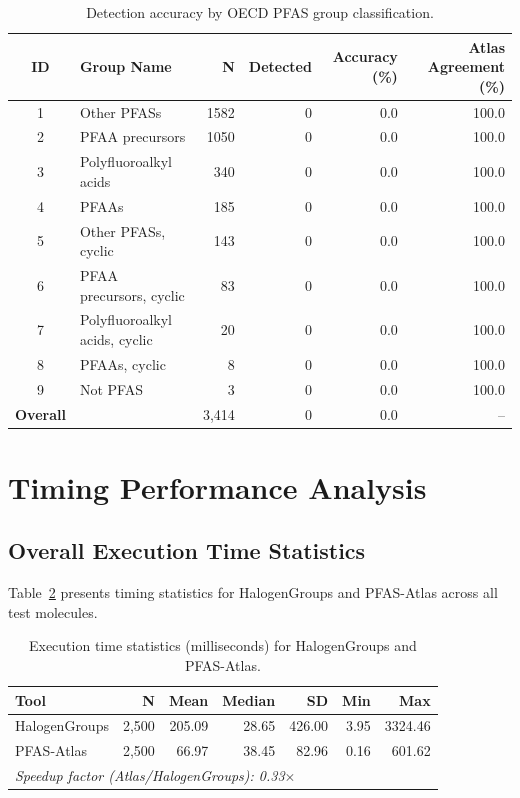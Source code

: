\begin{table}[htbp]
\centering
\caption{Detection accuracy by OECD PFAS group classification.}
\label{tab:oecd_accuracy}
\begin{tabular}{clrrrr}
\toprule
\rowcolor[HTML]{D6E4F5}\textbf{ID} & \textbf{Group Name} & \textbf{N} & \textbf{Detected} & \textbf{Accuracy (\%)} & \textbf{Atlas Agreement (\%)} \\
\midrule
\rowcolor[HTML]{FAEADE}1 & Other PFASs & 1582 & 0 & 0.0 & 100.0 \\
2 & PFAA precursors & 1050 & 0 & 0.0 & 100.0 \\
\rowcolor[HTML]{FAEADE}3 & Polyfluoroalkyl acids & 340 & 0 & 0.0 & 100.0 \\
4 & PFAAs & 185 & 0 & 0.0 & 100.0 \\
\rowcolor[HTML]{FAEADE}5 & Other PFASs, cyclic & 143 & 0 & 0.0 & 100.0 \\
6 & PFAA precursors, cyclic & 83 & 0 & 0.0 & 100.0 \\
\rowcolor[HTML]{FAEADE}7 & Polyfluoroalkyl acids, cyclic & 20 & 0 & 0.0 & 100.0 \\
8 & PFAAs, cyclic & 8 & 0 & 0.0 & 100.0 \\
\rowcolor[HTML]{FAEADE}9 & Not PFAS & 3 & 0 & 0.0 & 100.0 \\
\midrule
\textbf{Overall} & & 3,414 & 0 & 0.0 & -- \\
\bottomrule
\end{tabular}
\end{table}

\section*{Timing Performance Analysis}

\subsection*{Overall Execution Time Statistics}

Table~\ref{tab:timing_overall} presents timing statistics for HalogenGroups and PFAS-Atlas across all test molecules.

\begin{table}[htbp]
\centering
\caption{Execution time statistics (milliseconds) for HalogenGroups and PFAS-Atlas.}
\label{tab:timing_overall}
\begin{tabular}{lrrrrrr}
\toprule
\rowcolor[HTML]{D6E4F5}\textbf{Tool} & \textbf{N} & \textbf{Mean} & \textbf{Median} & \textbf{SD} & \textbf{Min} & \textbf{Max} \\
\midrule
\rowcolor[HTML]{FAEADE}HalogenGroups & 2,500 & 205.09 & 28.65 & 426.00 & 3.95 & 3324.46 \\
\rowcolor[HTML]{D6E4F5}PFAS-Atlas & 2,500 & 66.97 & 38.45 & 82.96 & 0.16 & 601.62 \\
\midrule
\multicolumn{7}{l}{\textit{Speedup factor (Atlas/HalogenGroups): 0.33$\times$}} \\
\bottomrule
\end{tabular}
\end{table}

